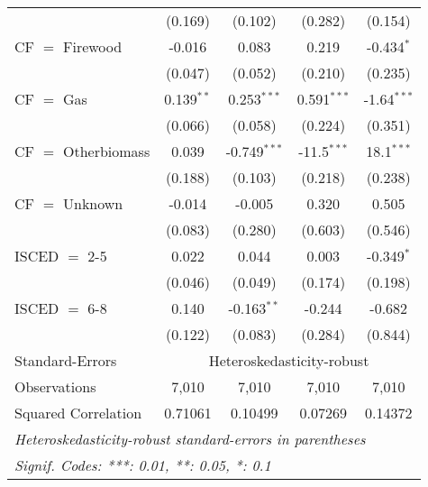 \begin{table}[htbp!]
\begin{adjustbox}{width = 1\textwidth, max height = 0.95\textheight, center}
\begin{threeparttable}[b]
\begin{tabular}{lcccc}
                                 & (0.169)            & (0.102)            & (0.282)       & (0.154)\\   
            CF $=$ Firewood      & -0.016             & 0.083              & 0.219         & -0.434$^{*}$\\   
                                 & (0.047)            & (0.052)            & (0.210)       & (0.235)\\   
            CF $=$ Gas           & 0.139$^{**}$       & 0.253$^{***}$      & 0.591$^{***}$ & -1.64$^{***}$\\   
                                 & (0.066)            & (0.058)            & (0.224)       & (0.351)\\   
            CF $=$ Otherbiomass  & 0.039              & -0.749$^{***}$     & -11.5$^{***}$ & 18.1$^{***}$\\   
                                 & (0.188)            & (0.103)            & (0.218)       & (0.238)\\   
            CF $=$ Unknown       & -0.014             & -0.005             & 0.320         & 0.505\\   
                                 & (0.083)            & (0.280)            & (0.603)       & (0.546)\\   
            ISCED $=$ 2-5        & 0.022              & 0.044              & 0.003         & -0.349$^{*}$\\   
                                 & (0.046)            & (0.049)            & (0.174)       & (0.198)\\   
            ISCED $=$ 6-8        & 0.140              & -0.163$^{**}$      & -0.244        & -0.682\\   
                                 & (0.122)            & (0.083)            & (0.284)       & (0.844)\\   
            \midrule 
            Standard-Errors & \multicolumn{4}{c}{Heteroskedasticity-robust} \\ 
            Observations         & 7,010              & 7,010              & 7,010         & 7,010\\  
            Squared Correlation  & 0.71061            & 0.10499            & 0.07269       & 0.14372\\  
            \midrule \midrule
            \multicolumn{5}{l}{\emph{Heteroskedasticity-robust standard-errors in parentheses}}\\
            \multicolumn{5}{l}{\emph{Signif. Codes: ***: 0.01, **: 0.05, *: 0.1}}\\
         \end{tabular}
         

\end{threeparttable}
\end{adjustbox}
\end{table}
